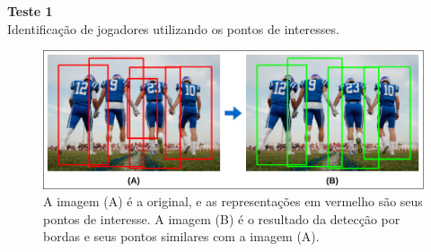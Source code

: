 \textbf{Teste 1}\\
Identificação de jogadores utilizando os pontos de interesses.

\begin{figure}
    \centering
    \caption{\label{fig_comparativo_img}A imagem (A) é a original, e as representações em vermelho são seus pontos de interesse. A imagem (B) é o resultado da detecção por bordas e seus pontos similares com a imagem (A).}
    \includegraphics[scale=0.3]{05-SLIDES_DESENVOLVIMENTO/Etapa_de_Testes/imagens_testes/comparativo_imagem.png}
\end{figure}
